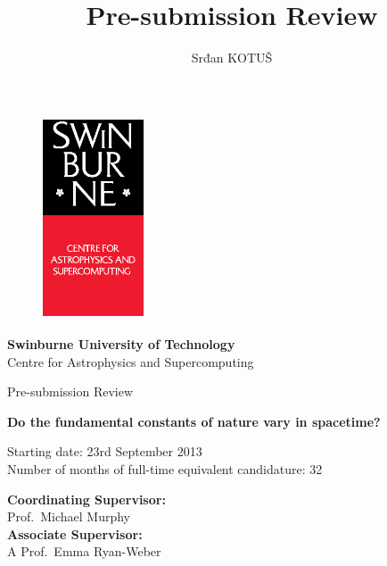 \documentclass[useAMS,usenatbib,onecolumn]{mnras}
\title{Pre-submission Review}
\author[Srđan KOTUŠ]
 {Srđan KOTUŠ}
\begin{document}
\fontsize{11}{12.5}\selectfont
\begin{center}

\begin{figure}
\begin{center}
\includegraphics[height=6cm,width=3cm]{./astro_v.eps}
\end{center}
\end{figure}

{\bf \LARGE S\Large winburne \LARGE U\Large niversity of  \LARGE T\Large echnology\\
\vspace{0.5cm}}
\LARGE C\Large entre for \LARGE A\Large strophysics and \LARGE S\Large upercomputing\\
\vspace{0.5cm}

\large Pre-submission Review\\
\vspace{0.5cm}



\Huge{\bf Do the fundamental constants of nature vary in spacetime?}

\vspace{3cm}
\large{Starting date: 23rd September 2013\\}
\vspace{0.2cm}
\large{Number of months of full-time equivalent candidature: 32}
\vspace{0.5cm}
\end{center}


\begin{flushleft}
{\bf Coordinating Supervisor:}\\
Prof.~Michael Murphy\\
\vspace{0.5cm}
{\bf Associate Supervisor:}\\
A Prof.~Emma Ryan-Weber\\
\end{flushleft}
\end{document}
